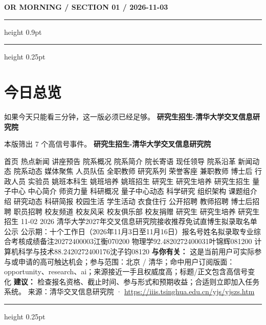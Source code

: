 \documentclass[10.5pt]{ctexart}
\begin{document}
{\small\bfseries OR MORNING / SECTION 01 / 2026-11-03}
\vspace{2mm}
\hrule height 0.9pt
\vspace{1.5mm}
\hrule height 0.25pt
\vspace{4mm}
\section*{今日总览}
{\color{ormuted} 如果今天只能看三分钟，这一版必须已经足够。}
\vspace{2mm}
{\fontsize{25}{29}\selectfont\bfseries 研究生招生-清华大学交叉信息研究院}\par
\vspace{2mm}
{\large 本版筛出 7 个高信号事件。}
\vspace{3mm}
{\Large\bfseries 研究生招生-清华大学交叉信息研究院}\par
首页 热点新闻 讲座预告 院系概况 院系简介 院长寄语 现任领导 院系沿革 新闻动态 院系动态 媒体聚焦 人员队伍 全职教师 研究系列 荣誉客座 兼职教师 博士后 行政人员 实验员 姚班本科生 姚班培养 姚班招生 研究生 研究生培养 研究生招生 量子中心 中心简介 师资力量 科研概况 量子中心动态 科学研究 组织架构 课题组介绍 研究动态 科研简报 校园生活 学生活动 衣食住行 公开招聘 教师招聘 博士后招聘 职员招聘 校友频道 校友风采 校友俱乐部 校友捐赠 研究生 研究生培养 研究生招生 11-02 2026 清华大学2027年交叉信息研究院接收推荐免试直博生拟录取名单公示 公示期：十个工作日（2026年11月3日至11月16日）报名号姓名拟录取专业综合考核成绩备注20272400003江衡070200 物理学92.4820272400031叶锦辉081200 计算机科学与技术88.2420272400176沈子钧08120
\textbf{与你有关：} 这是当前用户可实际参与或申请的高可触达机会；参与范围：北京 / 清华；命中用户订阅版面：opportunity、research、ai；来源接近一手且权威度高；标题/正文包含高信号变化
\textbf{建议：} 检查报名资格、截止时间、参与形式和预期收益；合适则立即加入任务系统。
{\footnotesize\color{ormuted} 来源：清华交叉信息研究院 · \url{https://iiis.tsinghua.edu.cn/yjs/yjszs.htm}}
\vspace{3mm}
\hrule height 0.25pt
\vspace{3mm}
\end{document}
